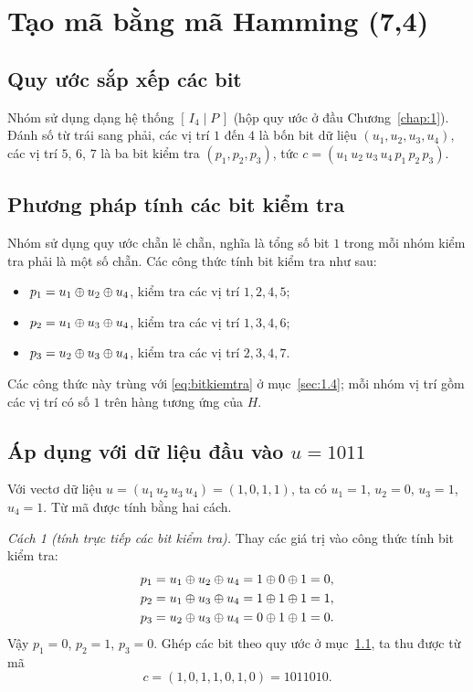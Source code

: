 \section{Tạo mã bằng mã Hamming (7,4)}
\label{sec:3.2}

\subsection{Quy ước sắp xếp các bit}
\label{ss:3.2.1}

Nhóm sử dụng dạng hệ thống $[\,I_4 \mid P\,]$ (hộp quy ước ở đầu
Chương~\ref{chap:1}). Đánh số từ trái sang phải, các vị trí $1$ đến $4$ là bốn
bit dữ liệu $(u_1, u_2, u_3, u_4)$, các vị trí $5$, $6$, $7$ là ba bit kiểm tra
$(p_1, p_2, p_3)$, tức $c = (u_1\,u_2\,u_3\,u_4\,p_1\,p_2\,p_3)$.

\subsection{Phương pháp tính các bit kiểm tra}
\label{ss:3.2.2}

Nhóm sử dụng quy ước chẵn lẻ chẵn, nghĩa là tổng số bit $1$ trong mỗi nhóm
kiểm tra phải là một số chẵn. Các công thức tính bit kiểm tra như sau:
\begin{itemize}
  \item $p_1 = u_1 \oplus u_2 \oplus u_4$, kiểm tra các vị trí $1, 2, 4, 5$;
  \item $p_2 = u_1 \oplus u_3 \oplus u_4$, kiểm tra các vị trí $1, 3, 4, 6$;
  \item $p_3 = u_2 \oplus u_3 \oplus u_4$, kiểm tra các vị trí $2, 3, 4, 7$.
\end{itemize}
Các công thức này trùng với \eqref{eq:bitkiemtra} ở mục~\ref{sec:1.4}; mỗi nhóm
vị trí gồm các vị trí có số $1$ trên hàng tương ứng của $H$.

\subsection{Áp dụng với dữ liệu đầu vào \texorpdfstring{$u = 1011$}{u = 1011}}
\label{ss:3.2.3}

Với vectơ dữ liệu $u = (u_1\,u_2\,u_3\,u_4) = (1,0,1,1)$, ta có $u_1 = 1$,
$u_2 = 0$, $u_3 = 1$, $u_4 = 1$. Từ mã được tính bằng hai cách.

\emph{Cách 1 (tính trực tiếp các bit kiểm tra).} Thay các giá trị vào công thức
tính bit kiểm tra:
\begin{align*}
  p_1 &= u_1 \oplus u_2 \oplus u_4 = 1 \oplus 0 \oplus 1 = 0,\\*
  p_2 &= u_1 \oplus u_3 \oplus u_4 = 1 \oplus 1 \oplus 1 = 1,\\*
  p_3 &= u_2 \oplus u_3 \oplus u_4 = 0 \oplus 1 \oplus 1 = 0 .
\end{align*}
Vậy $p_1 = 0$, $p_2 = 1$, $p_3 = 0$. Ghép các bit theo quy ước ở
mục~\ref{ss:3.2.1}, ta thu được từ mã
\[
  c = (1,0,1,1,0,1,0) = 1011010 .
\]

